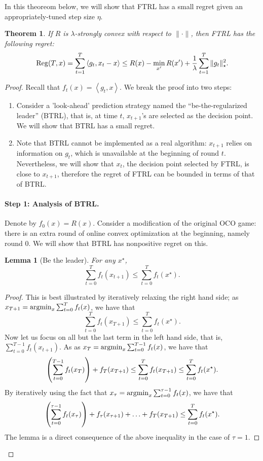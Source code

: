 \documentclass{article}
\newtheorem{theorem}{Theorem}
\newtheorem{lemma}{Lemma}
\DeclareMathOperator*{\Reg}{{\rm Reg}}
\DeclareMathOperator*{\argmin}{{\rm argmin}}
\newcommand{\inner}[2]{\left\langle #1,#2 \right\rangle}
\begin{document}
In this theoreom below, we will show that FTRL has a small regret given an appropriately-tuned step size $\eta$.

\begin{theorem}
If $R$ is $\lambda$-strongly convex with respect to $\| \cdot \|$, then FTRL has the following regret:
\[ \Reg(T, x) = \sum_{t=1}^T \inner{g_t}{x_t - x} \leq R(x) - \min_{x'} R(x') + \frac1 \lambda \sum_{t=1}^T \| g_t \|_\star^2. \]
\label{thm:ftrl}
\end{theorem}

\begin{proof}
Recall that $f_t(x) = \inner{g_t}{x}$. We break the proof into two steps:
\begin{enumerate}
  \item Consider a 'look-ahead' prediction strategy named the ``be-the-regularized leader'' (BTRL), that is, at time $t$, $x_{t+1}$'s are selected as the decision point. We will show that BTRL has a small regret.
  \item Note that BTRL cannot be implemented as a real algorithm: $x_{t+1}$ relies on information on $g_t$, which is unavailable at the beginning of round $t$. Nevertheless, we will show that $x_t$, the decision point selected by FTRL, is close to $x_{t+1}$, therefore the regret of FTRL can be bounded in terms of that of BTRL.
\end{enumerate}

\paragraph{Step 1: Analysis of BTRL.} Denote by $f_0(x) = R(x)$. Consider a modification of the original OCO game: there is an extra round of online convex optimization at the beginning, namely round 0.
We will show that BTRL has nonpositive regret on this.
\begin{lemma}[Be the leader]
For any $x^\star$,
\[ \sum_{t=0}^T f_t(x_{t+1}) \leq \sum_{t=0}^T f_t(x^\star). \]
\label{lem:btl}
\end{lemma}
\begin{proof}
This is best illustrated by iteratively relaxing the right hand side; as $x_{T+1} = \argmin_x \sum_{t=0}^T f_t(x)$, we have that
\[ \sum_{t=0}^T f_t(x_{T+1}) \leq \sum_{t=0}^T f_t(x^\star). \]
Now let us focus on all but the last term in the left hand side, that is, $\sum_{t=0}^{T-1} f_t(x_{t+1})$. As as $x_{T} = \argmin_x \sum_{t=0}^{T-1} f_t(x)$, we have that
\[ \del{\sum_{t=0}^{T-1} f_t(x_T)} + f_T(x_{T+1}) \leq \sum_{t=0}^T f_t(x_{T+1}) \leq \sum_{t=0}^T f_t(x^\star). \]
By iteratively using the fact that $x_{\tau} = \argmin_x \sum_{t=0}^{\tau-1} f_t(x)$, we have that
\[ \del{\sum_{t=0}^{\tau-1} f_t(x_\tau)} + f_{\tau}(x_{\tau+1}) + \ldots + f_{T}(x_{T+1}) \leq \sum_{t=0}^T f_t(x^\star). \]
The lemma is a direct consequence of the above inequality in the case of $\tau = 1$.
\end{proof}


\end{proof}
\end{document}
